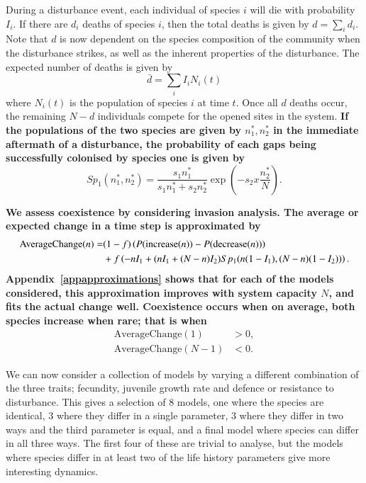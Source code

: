 During a disturbance event, each individual of species $i$ will die with probability $I_i$. If there are $d_i$ deaths of species $i$, then the total deaths is given by $d=\sum_i d_i$. Note that $d$ is now dependent on the species composition of the community when the disturbance strikes, as well as the inherent properties of the disturbance. The expected number of deaths is given by
\begin{equation}
\label{avdeaths} \bar{d}=\sum_i I_i N_i(t)
\end{equation}
where $N_i(t)$ is the population of species $i$ at time $t$. Once all $d$ deaths occur, the remaining $N-d$ individuals compete for the opened sites in the system. \textbf{If the populations of the two species are given by $n_1^*,n_2^*$ in the immediate aftermath of a disturbance, the probability of each gaps being successfully colonised by species one is given by}
\begin{equation}
\label{sp1}
Sp_1(n_1^*,n_2^*)=\frac{s_1 n_1^*}{s_1n_1^*+s_2n_2^*}\exp \left(-s_2 x\frac{n_2^*}{N}\right).
\end{equation}

\textbf{We assess coexistence by considering invasion analysis. The average or expected change in a time step is approximated by
\begin{align}
\label{ac}
\text{AverageChange}(n)=&(1-f)\left(P(\text{increase}(n))-P(\text{decrease}(n))\right)  \\
&+f\left(-nI_1 +(nI_1+(N-n)I_2)Sp_1(n(1-I_1),(N-n)(1-I_2))\right).\notag
\end{align}
Appendix~\ref{appapproximations} shows that for each of the models considered, this approximation improves with system capacity $N$, and fits the actual change well. Coexistence occurs when on average, both species increase when rare; that is when}
\begin{align*}
\text{AverageChange}(1)&>0,\\
\text{AverageChange}(N-1)&<0. \end{align*}

We can now consider a collection of models by varying a different combination of the three traits; fecundity, juvenile growth rate and defence or resistance to disturbance. This gives a selection of 8 models, one where the species are identical, 3 where they differ in a single parameter, 3 where they differ in two ways and the third parameter is equal, and a final model where species can differ in all three ways. The first four of these are trivial to analyse, but the models where species differ in at least two of the life history parameters give more interesting dynamics.

